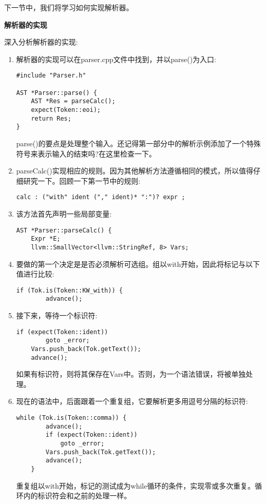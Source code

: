 下一节中，我们将学习如何实现解析器。\par

\hspace*{\fill} \par %
\textbf{解析器的实现}

深入分析解析器的实现:\par

\begin{enumerate}
\item 解析器的实现可以在parser.cpp文件中找到，并以parse()为入口:
\begin{lstlisting}[caption={}]
#include "Parser.h"

AST *Parser::parse() {
	AST *Res = parseCalc();
	expect(Token::eoi);
	return Res;
}
\end{lstlisting}
parse()的要点是处理整个输入。还记得第一部分中的解析示例添加了一个特殊符号来表示输入的结束吗?在这里检查一下。

\item parseCalc()实现相应的规则。因为其他解析方法遵循相同的模式，所以值得仔细研究一下。回顾一下第一节中的规则:
\begin{lstlisting}[caption={}]
calc : ("with" ident ("," ident)* ":")? expr ;
\end{lstlisting}

\item 该方法首先声明一些局部变量:
\begin{lstlisting}[caption={}]
AST *Parser::parseCalc() {
	Expr *E;
	llvm::SmallVector<llvm::StringRef, 8> Vars;
\end{lstlisting}

\item 要做的第一个决定是是否必须解析可选组。组以with开始，因此将标记与以下值进行比较:
\begin{lstlisting}[caption={}]
	if (Tok.is(Token::KW_with)) {
		advance();
\end{lstlisting}

\item 接下来，等待一个标识符:
\begin{lstlisting}[caption={}]
	if (expect(Token::ident))
		goto _error;
	Vars.push_back(Tok.getText());
	advance();
\end{lstlisting}
如果有标识符，则将其保存在Vars中。否则，为一个语法错误，将被单独处理。

\item 现在的语法中，后面跟着一个重复组，它要解析更多用逗号分隔的标识符:
\begin{lstlisting}[caption={}]
	while (Tok.is(Token::comma)) {
		advance();
		if (expect(Token::ident))
			goto _error;
		Vars.push_back(Tok.getText());
		advance();
	}
\end{lstlisting}
重复组以with开始，标记的测试成为while循环的条件，实现零或多次重复。循环内的标识符会和之前的处理一样。


\end{enumerate}
